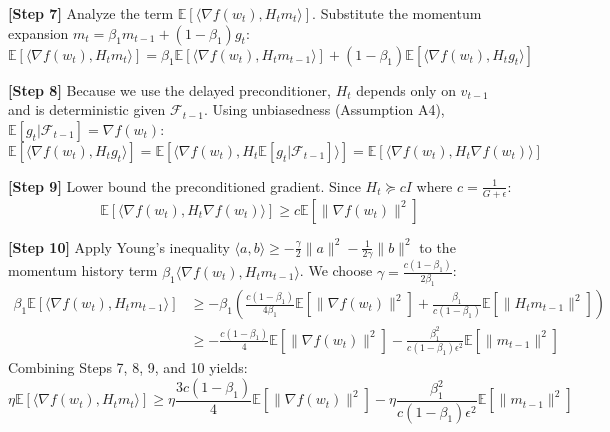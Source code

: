 \documentclass[11pt]{article}
\begin{document}
\textbf{[Step 7]} Analyze the term $\mathbb{E}[\langle \nabla f(w_t), H_t m_t \rangle]$. Substitute the momentum expansion $m_t = \beta_1 m_{t-1} + (1-\beta_1) g_t$:
\begin{equation}
    \mathbb{E}[\langle \nabla f(w_t), H_t m_t \rangle] = \beta_1 \mathbb{E}[\langle \nabla f(w_t), H_t m_{t-1} \rangle] + (1-\beta_1) \mathbb{E}[\langle \nabla f(w_t), H_t g_t \rangle]
\end{equation}

\textbf{[Step 8]} Because we use the delayed preconditioner, $H_t$ depends only on $v_{t-1}$ and is deterministic given $\mathcal{F}_{t-1}$. Using unbiasedness (Assumption A4), $\mathbb{E}[g_t | \mathcal{F}_{t-1}] = \nabla f(w_t)$:
\begin{equation}
    \mathbb{E}[\langle \nabla f(w_t), H_t g_t \rangle] = \mathbb{E}[\langle \nabla f(w_t), H_t \mathbb{E}[g_t | \mathcal{F}_{t-1}] \rangle] = \mathbb{E}[\langle \nabla f(w_t), H_t \nabla f(w_t) \rangle]
\end{equation}

\textbf{[Step 9]} Lower bound the preconditioned gradient. Since $H_t \succeq c I$ where $c = \frac{1}{G+\epsilon}$:
\begin{equation}
    \mathbb{E}[\langle \nabla f(w_t), H_t \nabla f(w_t) \rangle] \geq c \mathbb{E}[\|\nabla f(w_t)\|^2]
\end{equation}

\textbf{[Step 10]} Apply Young's inequality $\langle a, b \rangle \geq -\frac{\gamma}{2}\|a\|^2 - \frac{1}{2\gamma}\|b\|^2$ to the momentum history term $\beta_1 \langle \nabla f(w_t), H_t m_{t-1} \rangle$. We choose $\gamma = \frac{c(1-\beta_1)}{2\beta_1}$:
\begin{align}
    \beta_1 \mathbb{E}[\langle \nabla f(w_t), H_t m_{t-1} \rangle] &\geq -\beta_1 \left( \frac{c(1-\beta_1)}{4\beta_1} \mathbb{E}[\|\nabla f(w_t)\|^2] + \frac{\beta_1}{c(1-\beta_1)} \mathbb{E}[\|H_t m_{t-1}\|^2] \right) \nonumber \\
    &\geq -\frac{c(1-\beta_1)}{4} \mathbb{E}[\|\nabla f(w_t)\|^2] - \frac{\beta_1^2}{c(1-\beta_1)\epsilon^2} \mathbb{E}[\|m_{t-1}\|^2]
\end{align}
Combining Steps 7, 8, 9, and 10 yields:
\begin{equation}
    \eta \mathbb{E}[\langle \nabla f(w_t), H_t m_t \rangle] \geq \eta \frac{3c(1-\beta_1)}{4} \mathbb{E}[\|\nabla f(w_t)\|^2] - \eta \frac{\beta_1^2}{c(1-\beta_1)\epsilon^2} \mathbb{E}[\|m_{t-1}\|^2]
\end{equation}
\end{document}

